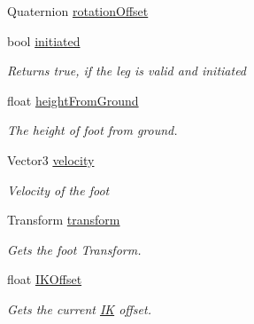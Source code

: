 \begin{DoxyCompactItemize}
Quaternion \mbox{\hyperlink{class_root_motion_1_1_final_i_k_1_1_grounding_1_1_leg_aed4a92c29786d3b47570f920f21c1ee9}{rotation\+Offset}}
\item 
bool \mbox{\hyperlink{class_root_motion_1_1_final_i_k_1_1_grounding_1_1_leg_a815318e26be8c27d8a403961ba9a7a6a}{initiated}}
\begin{DoxyCompactList}\small\item\em Returns true, if the leg is valid and initiated \end{DoxyCompactList}\item 
float \mbox{\hyperlink{class_root_motion_1_1_final_i_k_1_1_grounding_1_1_leg_aa122af90fbe0988251f930eb2bea5464}{height\+From\+Ground}}
\begin{DoxyCompactList}\small\item\em The height of foot from ground. \end{DoxyCompactList}\item 
Vector3 \mbox{\hyperlink{class_root_motion_1_1_final_i_k_1_1_grounding_1_1_leg_a472a262c239b7873c2b4b150d9777700}{velocity}}
\begin{DoxyCompactList}\small\item\em Velocity of the foot \end{DoxyCompactList}\item 
Transform \mbox{\hyperlink{class_root_motion_1_1_final_i_k_1_1_grounding_1_1_leg_a97117a5b07d03252a6888dd710c30ea2}{transform}}
\begin{DoxyCompactList}\small\item\em Gets the foot Transform. \end{DoxyCompactList}\item 
float \mbox{\hyperlink{class_root_motion_1_1_final_i_k_1_1_grounding_1_1_leg_aabd161c74e237920a41017051e1e9d4e}{I\+K\+Offset}}
\begin{DoxyCompactList}\small\item\em Gets the current \mbox{\hyperlink{class_root_motion_1_1_final_i_k_1_1_i_k}{IK}} offset. \end{DoxyCompactList}\item 

\end{DoxyCompactItemize}
